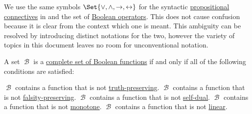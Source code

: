 \begin{remark}\label{rem:propositional_connectives_ambiguity}
  We use the same symbols \( \Set{ \vee, \wedge, \to, \leftrightarrow } \) for the syntactic \hyperref[def:propositional_language/connectives]{propositional connectives} in  and the set of \hyperref[def:standard_boolean_operators]{Boolean operators}. This does not cause confusion because it is clear from the context which one is meant. This ambiguity can be resolved by introducing distinct notations for the two, however the variety of topics in this document leaves no room for unconventional notation.
\end{remark}

\begin{theorem}\label{thm:posts_completeness_theorem}
  A set \( \mscrB \) is a \hyperref[def:boolean_closure]{complete set of Boolean functions} if and only if all of the following conditions are satisfied:
  \begin{PropEnum}
     \( \mscrB \) contains a function that is not \hyperref[def:boolean_functions_in_f2/truth_preserving]{truth-preserving}.
     \( \mscrB \) contains a function that is not \hyperref[def:boolean_functions_in_f2/falsity_preserving]{falsity-preserving}.
     \( \mscrB \) contains a function that is not \hyperref[def:boolean_functions_in_f2/self_dual]{self-dual}.
     \( \mscrB \) contains a function that is not \hyperref[def:boolean_functions_in_f2/monotone]{monotone}.
     \( \mscrB \) contains a function that is not \hyperref[def:boolean_functions_in_f2/linear]{linear}.
  \end{PropEnum}
\end{theorem}

